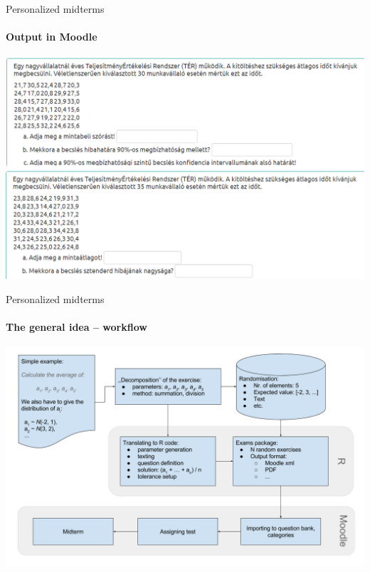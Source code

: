 \documentclass[10pt]{beamer}
\begin{document}
\begin{frame}{Personalized midterms}
\framesubtitle{Output in Moodle}
\begin{center}
\includegraphics[scale=0.4]{graph/moodle.png}
\end{center}
\end{frame}

\begin{frame}{Personalized midterms}
\framesubtitle{The general idea -- workflow}
\begin{center}
\includegraphics[width = \textwidth]{graph/zh_workflow_eng.png}
\end{center}
\end{frame}
\end{document}
